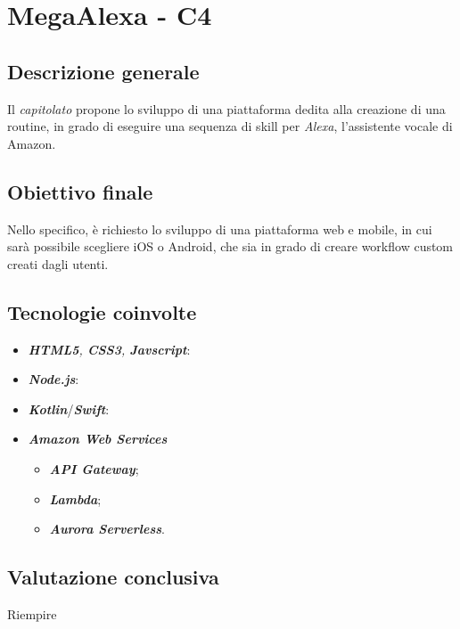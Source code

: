 \section{MegaAlexa - C4} \label{c4}
    \subsection{Descrizione generale}
    Il \textit{capitolato} propone lo sviluppo di una piattaforma
    dedita alla creazione di una routine, in grado di eseguire una sequenza
    di skill per \textit{Alexa}, l'assistente vocale di Amazon.

    \subsection{Obiettivo finale}
    Nello specifico, \`e richiesto lo sviluppo di una piattaforma web e
    mobile, in cui sarà possibile scegliere iOS o Android, che sia in grado di 
    creare workflow custom creati dagli utenti.

    \subsection{Tecnologie coinvolte}
    \begin{itemize}
        \item \textit{\textbf{HTML5}, \textbf{CSS3}, \textbf{Javscript}}:
        \item \textit{\textbf{Node.js}}:
        \item \textit{\textbf{Kotlin}}/\textit{\textbf{Swift}}:
        \item \textit{\textbf{Amazon Web Services}}
            \begin{itemize}
                \item \textit{\textbf{API Gateway}};
                \item \textit{\textbf{Lambda}};
                \item \textit{\textbf{Aurora Serverless}}.
            \end{itemize}
    \end{itemize}

    \subsection{Valutazione conclusiva}
    Riempire
